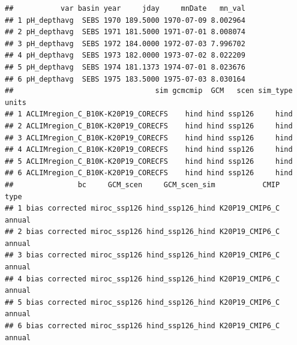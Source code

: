 \documentclass[
]{article}
\newenvironment{Shaded}{\begin{snugshade}}{\end{snugshade}}
\newcommand{\AttributeTok}[1]{\textcolor[rgb]{0.77,0.63,0.00}{#1}}
\newcommand{\CommentTok}[1]{\textcolor[rgb]{0.56,0.35,0.01}{\textit{#1}}}
\newcommand{\DecValTok}[1]{\textcolor[rgb]{0.00,0.00,0.81}{#1}}
\newcommand{\FunctionTok}[1]{\textcolor[rgb]{0.00,0.00,0.00}{#1}}
\newcommand{\NormalTok}[1]{#1}
\newcommand{\OtherTok}[1]{\textcolor[rgb]{0.56,0.35,0.01}{#1}}
\newcommand{\SpecialCharTok}[1]{\textcolor[rgb]{0.00,0.00,0.00}{#1}}
\newcommand{\StringTok}[1]{\textcolor[rgb]{0.31,0.60,0.02}{#1}}
\begin{document}
\begin{Shaded}
\end{Shaded}

\begin{verbatim}
##           var basin year     jday     mnDate   mn_val
## 1 pH_depthavg  SEBS 1970 189.5000 1970-07-09 8.002964
## 2 pH_depthavg  SEBS 1971 181.5000 1971-07-01 8.008074
## 3 pH_depthavg  SEBS 1972 184.0000 1972-07-03 7.996702
## 4 pH_depthavg  SEBS 1973 182.0000 1973-07-02 8.022209
## 5 pH_depthavg  SEBS 1974 181.1373 1974-07-01 8.023676
## 6 pH_depthavg  SEBS 1975 183.5000 1975-07-03 8.030164
##                                 sim gcmcmip  GCM   scen sim_type units
## 1 ACLIMregion_C_B10K-K20P19_CORECFS    hind hind ssp126     hind      
## 2 ACLIMregion_C_B10K-K20P19_CORECFS    hind hind ssp126     hind      
## 3 ACLIMregion_C_B10K-K20P19_CORECFS    hind hind ssp126     hind      
## 4 ACLIMregion_C_B10K-K20P19_CORECFS    hind hind ssp126     hind      
## 5 ACLIMregion_C_B10K-K20P19_CORECFS    hind hind ssp126     hind      
## 6 ACLIMregion_C_B10K-K20P19_CORECFS    hind hind ssp126     hind      
##               bc     GCM_scen     GCM_scen_sim           CMIP   type
## 1 bias corrected miroc_ssp126 hind_ssp126_hind K20P19_CMIP6_C annual
## 2 bias corrected miroc_ssp126 hind_ssp126_hind K20P19_CMIP6_C annual
## 3 bias corrected miroc_ssp126 hind_ssp126_hind K20P19_CMIP6_C annual
## 4 bias corrected miroc_ssp126 hind_ssp126_hind K20P19_CMIP6_C annual
## 5 bias corrected miroc_ssp126 hind_ssp126_hind K20P19_CMIP6_C annual
## 6 bias corrected miroc_ssp126 hind_ssp126_hind K20P19_CMIP6_C annual
\end{verbatim}
\end{document}
